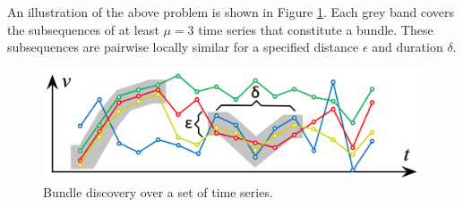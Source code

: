 An illustration of the above problem is shown in Figure \ref{fig:bundle_disc}. Each grey band covers the subsequences of at least $\mu=3$ time series that constitute a bundle. These subsequences are pairwise locally similar for a specified distance $\epsilon$ and duration $\delta$.

\begin{figure}[tb]
    \centering
    \includegraphics[width=\columnwidth]{figures/bundle_disc.png}
    \caption{Bundle discovery over a set of time series.}
    \label{fig:bundle_disc}
\end{figure}